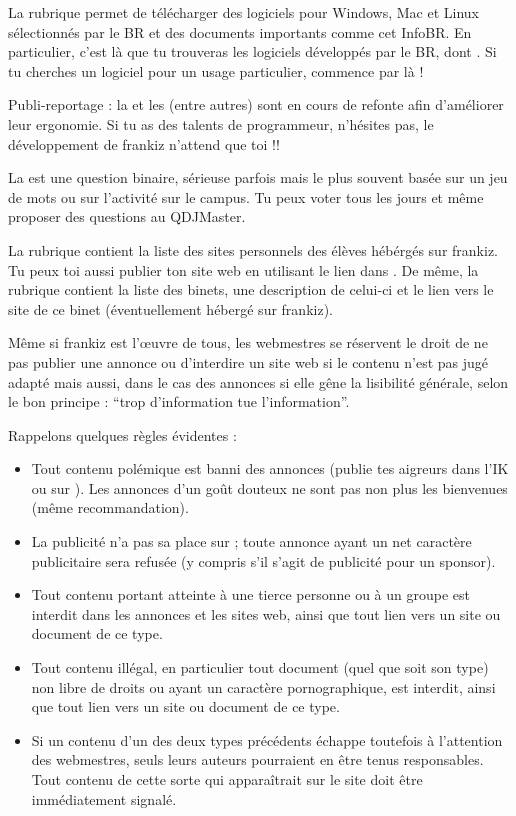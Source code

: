 La rubrique  permet de t\'el\'echarger des logiciels pour Windows, Mac et Linux
s\'electionn\'es par le BR et des documents importants comme cet InfoBR.
En particulier, c'est l\`a que tu trouveras les logiciels d\'evelopp\'es par le BR, dont .
Si tu cherches un logiciel pour un usage particulier, commence par l\`a !

Publi-reportage : la  et les  (entre autres) sont en cours de refonte
afin d'am\'eliorer leur ergonomie.
Si tu as des talents de programmeur, n'h\'esites pas, le d\'eveloppement de frankiz n'attend que toi !!

La  est une question binaire, s\'erieuse parfois mais le plus souvent bas\'ee sur un jeu de mots
ou sur l'activit\'e sur le campus.
Tu peux voter tous les jours et m\^eme proposer des questions au QDJMaster.

La rubrique  contient la liste des sites personnels des \'el\`eves h\'eb\'erg\'es sur frankiz.
Tu peux toi aussi publier ton site web en utilisant le lien dans .
De m\^eme, la rubrique  contient la liste des binets, une description de celui-ci
et le lien vers le site de ce binet (\'eventuellement h\'eberg\'e sur frankiz).

M\^eme si frankiz est l'\oe uvre de tous, les webmestres se r\'eservent le droit de ne pas publier une annonce
ou d'interdire un site web si le contenu n'est pas jug\'e adapt\'e mais aussi,
dans le cas des annonces si elle g\^ene la lisibilit\'e g\'en\'erale, selon le bon principe :
``trop d'information tue l'information''.

Rappelons quelques r\`egles \'evidentes :
\begin{itemize}
 \item Tout contenu pol\'emique est banni des annonces (publie tes aigreurs dans l'IK ou sur ).
       Les annonces d'un go\^ut douteux ne sont pas non plus les bienvenues (m\^eme recommandation).
 \item La publicit\'e n'a pas sa place sur \fkz ; toute annonce ayant un net caract\`ere publicitaire
       sera refus\'ee (y compris s'il s'agit de publicit\'e pour un sponsor).
 \item Tout contenu portant atteinte \`a une tierce personne ou \`a un groupe est interdit dans les annonces
       et les sites web, ainsi que tout lien vers un site ou document de ce type.
 \item Tout contenu ill\'egal, en particulier tout document (quel que soit son type)
       non libre de droits ou ayant un caract\`ere pornographique, est interdit,
       ainsi que tout lien vers un site ou document de ce type.
 \item Si un contenu d'un des deux types pr\'ec\'edents \'echappe toutefois \`a l'attention des webmestres,
       seuls leurs auteurs pourraient en \^etre tenus responsables.
       Tout contenu de cette sorte qui appara\^itrait sur le site doit \^etre imm\'ediatement signal\'e.
\end{itemize}

